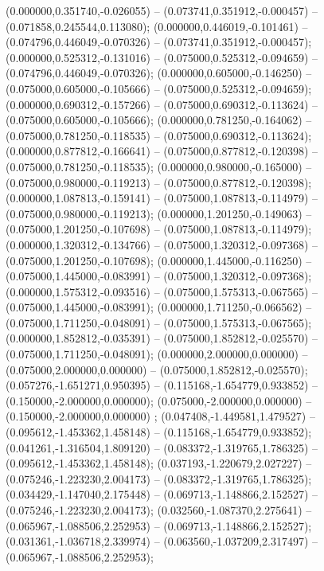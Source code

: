  (0.000000,0.351740,-0.026055) -- (0.073741,0.351912,-0.000457) -- (0.071858,0.245544,0.113080);
 (0.000000,0.446019,-0.101461) -- (0.074796,0.446049,-0.070326) -- (0.073741,0.351912,-0.000457);
 (0.000000,0.525312,-0.131016) -- (0.075000,0.525312,-0.094659) -- (0.074796,0.446049,-0.070326);
 (0.000000,0.605000,-0.146250) -- (0.075000,0.605000,-0.105666) -- (0.075000,0.525312,-0.094659);
 (0.000000,0.690312,-0.157266) -- (0.075000,0.690312,-0.113624) -- (0.075000,0.605000,-0.105666);
 (0.000000,0.781250,-0.164062) -- (0.075000,0.781250,-0.118535) -- (0.075000,0.690312,-0.113624);
 (0.000000,0.877812,-0.166641) -- (0.075000,0.877812,-0.120398) -- (0.075000,0.781250,-0.118535);
 (0.000000,0.980000,-0.165000) -- (0.075000,0.980000,-0.119213) -- (0.075000,0.877812,-0.120398);
 (0.000000,1.087813,-0.159141) -- (0.075000,1.087813,-0.114979) -- (0.075000,0.980000,-0.119213);
 (0.000000,1.201250,-0.149063) -- (0.075000,1.201250,-0.107698) -- (0.075000,1.087813,-0.114979);
 (0.000000,1.320312,-0.134766) -- (0.075000,1.320312,-0.097368) -- (0.075000,1.201250,-0.107698);
 (0.000000,1.445000,-0.116250) -- (0.075000,1.445000,-0.083991) -- (0.075000,1.320312,-0.097368);
 (0.000000,1.575312,-0.093516) -- (0.075000,1.575313,-0.067565) -- (0.075000,1.445000,-0.083991);
 (0.000000,1.711250,-0.066562) -- (0.075000,1.711250,-0.048091) -- (0.075000,1.575313,-0.067565);
 (0.000000,1.852812,-0.035391) -- (0.075000,1.852812,-0.025570) -- (0.075000,1.711250,-0.048091);
 (0.000000,2.000000,0.000000) -- (0.075000,2.000000,0.000000) -- (0.075000,1.852812,-0.025570);
 (0.057276,-1.651271,0.950395) -- (0.115168,-1.654779,0.933852) -- (0.150000,-2.000000,0.000000);
 (0.075000,-2.000000,0.000000) -- (0.150000,-2.000000,0.000000) ;
 (0.047408,-1.449581,1.479527) -- (0.095612,-1.453362,1.458148) -- (0.115168,-1.654779,0.933852);
 (0.041261,-1.316504,1.809120) -- (0.083372,-1.319765,1.786325) -- (0.095612,-1.453362,1.458148);
 (0.037193,-1.220679,2.027227) -- (0.075246,-1.223230,2.004173) -- (0.083372,-1.319765,1.786325);
 (0.034429,-1.147040,2.175448) -- (0.069713,-1.148866,2.152527) -- (0.075246,-1.223230,2.004173);
 (0.032560,-1.087370,2.275641) -- (0.065967,-1.088506,2.252953) -- (0.069713,-1.148866,2.152527);
 (0.031361,-1.036718,2.339974) -- (0.063560,-1.037209,2.317497) -- (0.065967,-1.088506,2.252953);
